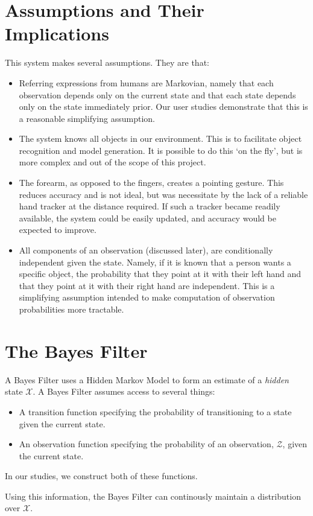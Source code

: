 \documentclass[a4paper, 11pt]{article} %
\begin{document}
\section{Assumptions and Their Implications}
This system makes several assumptions. They are that:
\begin{itemize}
\item Referring expressions from humans are Markovian, namely that each observation depends only on the current state and that each state depends only on the state immediately prior. Our user studies demonstrate that this is a reasonable simplifying assumption.
\item The system knows all objects in our environment. This is to facilitate object recognition and model generation. It is possible to do this `on the fly', but is more complex and out of the scope of this project.
\item The forearm, as opposed to the fingers, creates a pointing gesture. This reduces accuracy and is not ideal, but was necessitate by the lack of a reliable hand tracker at the distance required. If such a tracker became readily available, the system could be easily updated, and accuracy would be expected to improve.
\item All components of an observation (discussed later), are conditionally independent given the state. Namely, if it is known that a person wants a specific object, the probability that they point at it with their left hand and that they point at it with their right hand are independent. This is a simplifying assumption intended to make computation of observation probabilities more tractable.
\end{itemize}
\section{The Bayes Filter}
A Bayes Filter uses a Hidden Markov Model to form an estimate of a \textit{hidden} state $\mathcal{X}$. A Bayes Filter assumes access to several things:
\begin{itemize}
\item A transition function specifying the probability of transitioning to a state given the current state.
\item An observation function specifying the probability of an observation, $\mathcal{Z}$, given the current state.
\end{itemize}
In our studies, we construct both of these functions.

Using this information, the Bayes Filter can continously maintain a distribution over $\mathcal{X}$.
\end{document}
